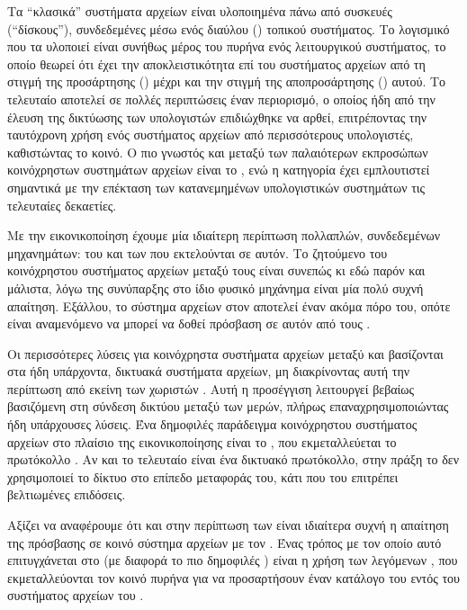 Τα ``κλασικά'' συστήματα αρχείων είναι υλοποιημένα πάνω από συσκευές 
(``δίσκους''), συνδεδεμένες μέσω ενός διαύλου () τοπικού συστήματος.
Το λογισμικό που τα υλοποιεί είναι συνήθως μέρος του πυρήνα ενός λειτουργικού
συστήματος, το οποίο θεωρεί ότι έχει την αποκλειστικότητα επί του συστήματος
αρχείων από τη στιγμή της προσάρτησης () μέχρι και την στιγμή της
αποπροσάρτησης () αυτού. Το τελευταίο αποτελεί σε πολλές περιπτώσεις
έναν περιορισμό, ο οποίος ήδη από την έλευση της δικτύωσης των υπολογιστών
επιδιώχθηκε να αρθεί, επιτρέποντας την ταυτόχρονη χρήση ενός συστήματος αρχείων
από περισσότερους υπολογιστές, καθιστώντας το κοινό. Ο πιο γνωστός και μεταξύ
των παλαιότερων εκπροσώπων κοινόχρηστων συστημάτων αρχείων είναι το  \cite{nfs},
ενώ η κατηγορία έχει εμπλουτιστεί σημαντικά με την επέκταση των κατανεμημένων
υπολογιστικών συστημάτων τις τελευταίες δεκαετίες.

Με την εικονικοποίηση έχουμε μία ιδιαίτερη περίπτωση πολλαπλών, συνδεδεμένων
μηχανημάτων: του \host{} και των  που εκτελούνται σε αυτόν.
Το ζητούμενο του κοινόχρηστου συστήματος αρχείων μεταξύ τους είναι συνεπώς κι
εδώ παρόν και μάλιστα, λόγω της συνύπαρξης στο ίδιο φυσικό μηχάνημα είναι μία
πολύ συχνή απαίτηση. Εξάλλου, το σύστημα αρχείων στον \host{} αποτελεί έναν
ακόμα πόρο του, οπότε είναι αναμενόμενο να μπορεί να δοθεί πρόσβαση σε αυτόν από
τους .

Οι περισσότερες λύσεις για κοινόχρηστα συστήματα αρχείων μεταξύ \host{} και
\guest{} βασίζονται στα ήδη υπάρχοντα, δικτυακά συστήματα αρχείων, μη
διακρίνοντας αυτή την περίπτωση από εκείνη των χωριστών . Αυτή η
προσέγγιση λειτουργεί βεβαίως βασιζόμενη στη σύνδεση δικτύου μεταξύ των μερών,
πλήρως επαναχρησιμοποιώντας ήδη υπάρχουσες λύσεις. Ένα δημοφιλές παράδειγμα
κοινόχρηστου συστήματος αρχείων στο πλαίσιο της εικονικοποίησης είναι το
 \cite{virtfs}, που εκμεταλλεύεται το πρωτόκολλο  \cite{9p}.
Αν και το τελευταίο είναι ένα δικτυακό πρωτόκολλο, στην πράξη το 
δεν χρησιμοποιεί το δίκτυο στο επίπεδο μεταφοράς του, κάτι που του επιτρέπει
βελτιωμένες επιδόσεις.

Αξίζει να αναφέρουμε ότι και στην περίπτωση των  είναι ιδιαίτερα
συχνή η απαίτηση της πρόσβασης σε κοινό σύστημα αρχείων με τον \host{}. Ένας
τρόπος με τον οποίο αυτό επιτυγχάνεται στο  \cite{docker}
(με διαφορά το πιο δημοφιλές ) είναι η χρήση των λεγόμενων
 \cite{docker:bind-mounts},
που εκμεταλλεύονται τον κοινό πυρήνα για να προσαρτήσουν έναν κατάλογο του
\host{} εντός του συστήματος αρχείων του .

